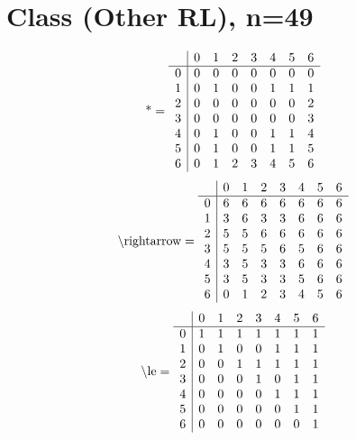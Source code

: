 \documentclass[11pt]{article}
\begin{document}
\section{Class (Other RL), n=49}
\[\text{*} = 
\begin{array}{r | r r r r r r r}
 & 0 & 1 & 2 & 3 & 4 & 5 & 6 \\ \hline
0 & 0 & 0 & 0 & 0 & 0 & 0 & 0 \\
1 & 0 & 1 & 0 & 0 & 1 & 1 & 1 \\
2 & 0 & 0 & 0 & 0 & 0 & 0 & 2 \\
3 & 0 & 0 & 0 & 0 & 0 & 0 & 3 \\
4 & 0 & 1 & 0 & 0 & 1 & 1 & 4 \\
5 & 0 & 1 & 0 & 0 & 1 & 1 & 5 \\
6 & 0 & 1 & 2 & 3 & 4 & 5 & 6 \\
\end{array}
\]
\[\text{\textbackslash rightarrow} = 
\begin{array}{r | r r r r r r r}
 & 0 & 1 & 2 & 3 & 4 & 5 & 6 \\ \hline
0 & 6 & 6 & 6 & 6 & 6 & 6 & 6 \\
1 & 3 & 6 & 3 & 3 & 6 & 6 & 6 \\
2 & 5 & 5 & 6 & 6 & 6 & 6 & 6 \\
3 & 5 & 5 & 5 & 6 & 5 & 6 & 6 \\
4 & 3 & 5 & 3 & 3 & 6 & 6 & 6 \\
5 & 3 & 5 & 3 & 3 & 5 & 6 & 6 \\
6 & 0 & 1 & 2 & 3 & 4 & 5 & 6 \\
\end{array}
\]
\[\text{\textbackslash le} = 
\begin{array}{r | r r r r r r r}
 & 0 & 1 & 2 & 3 & 4 & 5 & 6 \\ \hline
0 & 1 & 1 & 1 & 1 & 1 & 1 & 1 \\
1 & 0 & 1 & 0 & 0 & 1 & 1 & 1 \\
2 & 0 & 0 & 1 & 1 & 1 & 1 & 1 \\
3 & 0 & 0 & 0 & 1 & 0 & 1 & 1 \\
4 & 0 & 0 & 0 & 0 & 1 & 1 & 1 \\
5 & 0 & 0 & 0 & 0 & 0 & 1 & 1 \\
6 & 0 & 0 & 0 & 0 & 0 & 0 & 1 \\
\end{array}
\]
\end{document}
